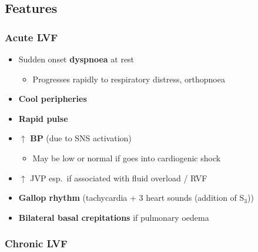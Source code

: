 \documentclass[
  12pt,
]{memoir}
\providecommand{\tightlist}{%
  \setlength{\itemsep}{0pt}\setlength{\parskip}{0pt}}
\begin{document}
\hypertarget{features-1}{%
\subsection{Features}\label{features-1}}

\hypertarget{acute-lvf}{%
\subsubsection{Acute LVF}\label{acute-lvf}}

\begin{itemize}
\tightlist
\item
  Sudden onset \textbf{dyspnoea} at rest

  \begin{itemize}
  \tightlist
  \item
    Progresses rapidly to respiratory distress, orthopnoea
  \end{itemize}
\item
  \textbf{Cool peripheries}
\item
  \textbf{Rapid pulse}
\item
  \(\boldsymbol\uparrow\) \textbf{BP} (due to SNS activation)

  \begin{itemize}
  \tightlist
  \item
    May be low or normal if goes into cardiogenic shock
  \end{itemize}
\item
  \(\uparrow\) JVP esp.~if associated with fluid overload / RVF
\item
  \textbf{Gallop rhythm} (tachycardia + 3 heart sounds (addition of
  S\(_3\)))
\item
  \textbf{Bilateral basal crepitations} if pulmonary oedema
\end{itemize}

\hypertarget{chronic-lvf}{%
\subsubsection{Chronic LVF}\label{chronic-lvf}}
\end{document}
